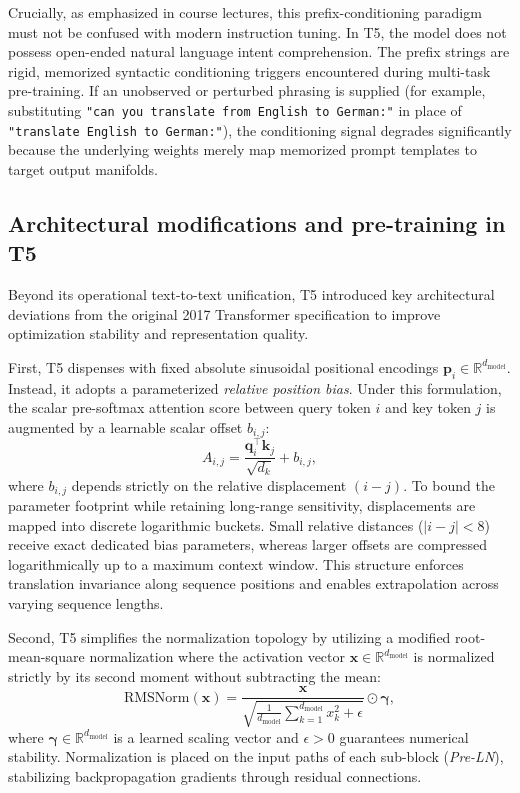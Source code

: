 \documentclass[../../../main.tex]{subfiles}
\begin{document}
Crucially, as emphasized in course lectures, this prefix-conditioning paradigm must not be confused with modern instruction tuning. In T5, the model does not possess open-ended natural language intent comprehension. The prefix strings are rigid, memorized syntactic conditioning triggers encountered during multi-task pre-training. If an unobserved or perturbed phrasing is supplied (for example, substituting \texttt{"can you translate from English to German:"} in place of \texttt{"translate English to German:"}), the conditioning signal degrades significantly because the underlying weights merely map memorized prompt templates to target output manifolds.


\subsection{Architectural modifications and pre-training in T5}
\label{subsec:t5_mechanics}

Beyond its operational text-to-text unification, T5 introduced key architectural deviations from the original 2017 Transformer specification to improve optimization stability and representation quality.

First, T5 dispenses with fixed absolute sinusoidal positional encodings $\mathbf{p}_i \in \mathbb{R}^{d_{\text{model}}}$. Instead, it adopts a parameterized \emph{relative position bias}. Under this formulation, the scalar pre-softmax attention score between query token $i$ and key token $j$ is augmented by a learnable scalar offset $b_{i,j}$:
\begin{equation}
A_{i,j} = \frac{\mathbf{q}_i^\top \mathbf{k}_j}{\sqrt{d_k}} + b_{i,j},
\label{eq:t5_relative_bias}
\end{equation}
where $b_{i,j}$ depends strictly on the relative displacement $(i - j)$. To bound the parameter footprint while retaining long-range sensitivity, displacements are mapped into discrete logarithmic buckets. Small relative distances ($|i - j| < 8$) receive exact dedicated bias parameters, whereas larger offsets are compressed logarithmically up to a maximum context window. This structure enforces translation invariance along sequence positions and enables extrapolation across varying sequence lengths.

Second, T5 simplifies the normalization topology by utilizing a modified root-mean-square normalization where the activation vector $\mathbf{x} \in \mathbb{R}^{d_{\text{model}}}$ is normalized strictly by its second moment without subtracting the mean:
\begin{equation}
\text{RMSNorm}(\mathbf{x}) = \frac{\mathbf{x}}{\sqrt{\frac{1}{d_{\text{model}}} \sum_{k=1}^{d_{\text{model}}} x_k^2 + \epsilon}} \odot \boldsymbol{\gamma},
\label{eq:t5_rmsnorm}
\end{equation}
where $\boldsymbol{\gamma} \in \mathbb{R}^{d_{\text{model}}}$ is a learned scaling vector and $\epsilon > 0$ guarantees numerical stability. Normalization is placed on the input paths of each sub-block (\emph{Pre-LN}), stabilizing backpropagation gradients through residual connections.
\end{document}
